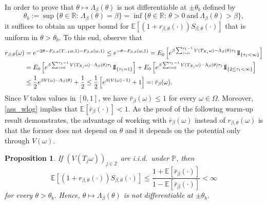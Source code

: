 \documentclass[a4paper]{amsart}
\numberwithin{equation}{section}
\theoremstyle{plain}
\newtheorem{proposition}[theorem]{\sc Proposition}
\theoremstyle{remark}
\begin{document}
In order to prove that $\theta\mapsto\Lambda_\beta(\theta)$ is not differentiable at $\pm\theta_b$ defined by $$\theta_b := \sup\{\theta\in\mathbb{R}:\,\Lambda_\beta(\theta)=\beta\} = \inf\{\theta\in\mathbb{R}:\,\theta>0\ \text{and}\ \Lambda_\beta(\theta)>\beta\},$$
it suffices to obtain an upper bound for $\mathbb{E}[(1 + r_{\beta,\theta}(\cdot))S_{\beta,\theta}(\cdot)]$ that is uniform in $\theta>\theta_b$. To this end, observe that 
\begin{align}
  \label{eq-star28}
r_{\beta,\theta}(\omega) &= e^{-2\theta - F_{\beta,\theta}(T_{-1}\omega,1) - F_{\beta,\theta}(\omega,1)} \le e^{-\theta - F_{\beta,\theta}(\omega,1)} = E_0\left[e^{\beta\sum_{i=0}^{\tau_1-1}V(T_{X_i}\omega) - \Lambda_\beta(\theta)\tau_1}{{{\rm 1\mkern-1.5mu}\!{\rm I}}}_{\{\tau_1<\infty\}}\right]\nonumber\\
&= E_0\left[e^{\beta\sum_{i=0}^{\tau_1-1}V(T_{X_i}\omega) - \Lambda_\beta(\theta)\tau_1}{{{\rm 1\mkern-1.5mu}\!{\rm I}}}_{\{\tau_1=1\}}\right] + E_0\left[e^{\beta\sum_{i=0}^{\tau_1-1}V(T_{X_i}\omega) - \Lambda_\beta(\theta)\tau_1}{{{\rm 1\mkern-1.5mu}\!{\rm I}}}_{\{2\le\tau_1<\infty\}}\right]\nonumber\\
&\le \frac1{2}e^{\beta V(\omega) - \Lambda_\beta(\theta)}  + \frac1{2} \le \frac1{2}\left[e^{\beta (V(\omega) - 1)} + 1\right] =: \bar r_\beta(\omega).
\end{align}
Since $V$ takes values in $[0,1]$, we have $\bar r_\beta(\omega)\le 1$ for every $\omega\in\Omega$. Moreover, \eqref{ass_wlog} implies that $\mathbb{E}[\bar r_\beta(\cdot)] < 1$. As the proof of the following warm-up result demonstrates, the advantage of working with $\bar r_\beta(\omega)$ instead of $r_{\beta,\theta}(\omega)$ is that the former does not depend on $\theta$ and it depends on the potential only through $V(\omega)$.

\begin{proposition}\label{nondifiid}
	If $\left(V(T_j\omega)\right)_{j\in\mathbb{Z}}$ are i.i.d.\ under $\mathbb{P}$, then
	$$\mathbb{E}[(1 + r_{\beta,\theta}(\cdot))S_{\beta,\theta}(\cdot)] \le \frac{1 + \mathbb{E}[\bar r_\beta(\cdot)]}{1 - \mathbb{E}[\bar r_\beta(\cdot)]} < \infty$$
	for every $\theta>\theta_b$. Hence, $\theta\mapsto\Lambda_\beta(\theta)$ is not differentiable at $\pm\theta_b$.
\end{proposition}
\end{document}
